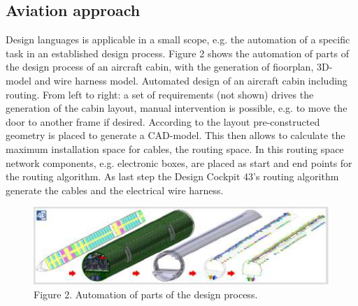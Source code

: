 \documentclass[8pt,twocolumn]{article}
\begin{document}
\subsection{Aviation approach}
Design languages is applicable in a small scope, e.g. the automation of a specific task in an established design process. Figure 2 shows the automation of parts of the design process of an aircraft cabin, with the generation of fioorplan, 3D-model and wire harness model. Automated design of an aircraft cabin including routing. From left to right: a set of requirements (not shown) drives the generation of the cabin layout, manual intervention is possible, e.g. to move the door to another frame if desired. According to the layout pre-constructed geometry is placed to generate a CAD-model. This then allows to calculate the maximum installation space for cables, the routing space. In this routing space network components, e.g. electronic boxes, are placed as start and end points for the routing algorithm. As last step the Design Cockpit 43’s routing algorithm generate the cables and the electrical wire harness. \begin{figure}[h]
    \centering
    \includegraphics[scale=0.7]{Figure2.png}
    \caption{Figure 2. Automation of parts of the design process.}
    \label{Fig2:image}
\end{figure}
\end{document}
